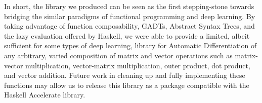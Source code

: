 \documentclass[prodmode,acmtecs]{acmsmall} %
\begin{document}
In short, the library we produced can be seen as the first stepping-stone towards bridging
the similar paradigms of functional programming and deep learning. By taking advantage of
function composability, GADTs, Abstract Syntax Trees, and the lazy evaluation offered by
Haskell, we were able to provide a limited, albeit sufficient for some types of deep
learning, library for Automatic Differentiation of any arbitrary, varied composition of
matrix and vector operations such as matrix-vector multiplication, vector-matrix
multiplication, outer product, dot product, and vector addition. Future work in cleaning up
and fully implementing these functions may allow us to release this library as a package
compatible with the Haskell Accelerate library.



\end{document}
